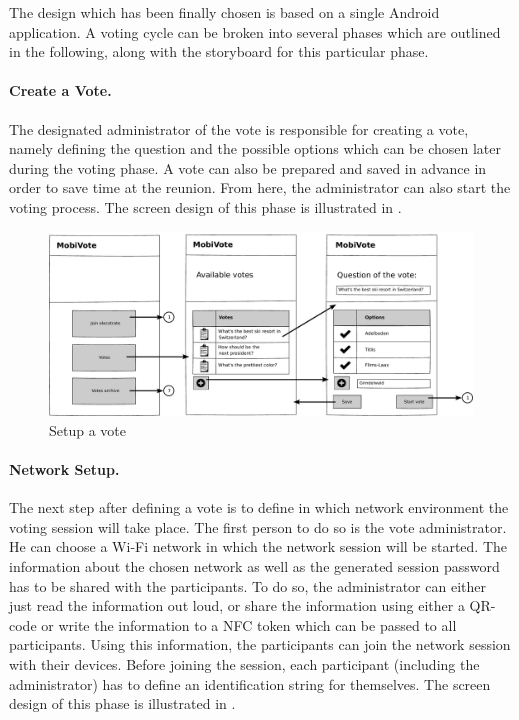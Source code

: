 \documentclass[numbers=noenddot, abstract=on, a4paper, headsepline,
footsepline, oneside, openright, draft=off, listof=leveldown]{scrreprt}
\begin{document}
The design which has been finally chosen is based on a single Android
application. A voting cycle can be broken into several phases which are outlined
in the following, along with the storyboard for this particular phase.

\paragraph{Create a Vote.}
The designated administrator of the vote is responsible for creating a vote,
namely defining the question and the possible options which can be chosen later
during the voting phase. A vote can also be prepared and saved in advance in
order to save time at the reunion. From here, the administrator can also
start the voting process. The screen design of this phase is illustrated in
.

\begin{figure}[htb]
	\centering
	\includegraphics[height=.3\textheight]{img/storyboard/vote_setup}
	\caption{Setup a vote}
	\label{fig:vote_setup}
\end{figure}

\paragraph{Network Setup.}
The next step after defining a vote is to define in which network environment
the voting session will take place. The first person to do so is the vote
administrator. He can choose a Wi-Fi network in which the network session will
be started. The information about the chosen network as well as the generated
session password has to be shared with the participants. To do so, the
administrator can either just read the information out loud, or share the
information using either a QR-code or write the information to a NFC token which
can be passed to all participants. Using this information, the participants can
join the network session with their devices. Before joining the session, each
participant (including the administrator) has to define an identification string
for themselves. The screen design of this phase is illustrated in
.
\end{document}

